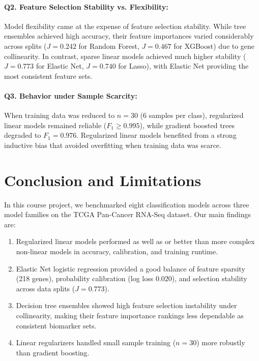 \documentclass[11pt,a4paper]{article}
\begin{document}
\paragraph{Q2. Feature Selection Stability vs. Flexibility:} 
Model flexibility came at the expense of feature selection stability. While tree ensembles achieved high accuracy, their feature importances varied considerably across splits ($J = 0.242$ for Random Forest, $J = 0.467$ for XGBoost) due to gene collinearity. In contrast, sparse linear models achieved much higher stability ($J = 0.773$ for Elastic Net, $J = 0.740$ for Lasso), with Elastic Net providing the most consistent feature sets.

\paragraph{Q3. Behavior under Sample Scarcity:} 
When training data was reduced to $n = 30$ (6 samples per class), regularized linear models remained reliable ($F_1 \ge 0.995$), while gradient boosted trees degraded to $F_1 = 0.976$. Regularized linear models benefited from a strong inductive bias that avoided overfitting when training data was scarce.

\section{Conclusion and Limitations}

In this course project, we benchmarked eight classification models across three model families on the TCGA Pan-Cancer RNA-Seq dataset. Our main findings are:
\begin{enumerate}
    \item Regularized linear models performed as well as or better than more complex non-linear models in accuracy, calibration, and training runtime.
    \item Elastic Net logistic regression provided a good balance of feature sparsity (218 genes), probability calibration (log loss $0.020$), and selection stability across data splits ($J = 0.773$).
    \item Decision tree ensembles showed high feature selection instability under collinearity, making their feature importance rankings less dependable as consistent biomarker sets.
    \item Linear regularizers handled small sample training ($n = 30$) more robustly than gradient boosting.
\end{enumerate}
\end{document}
